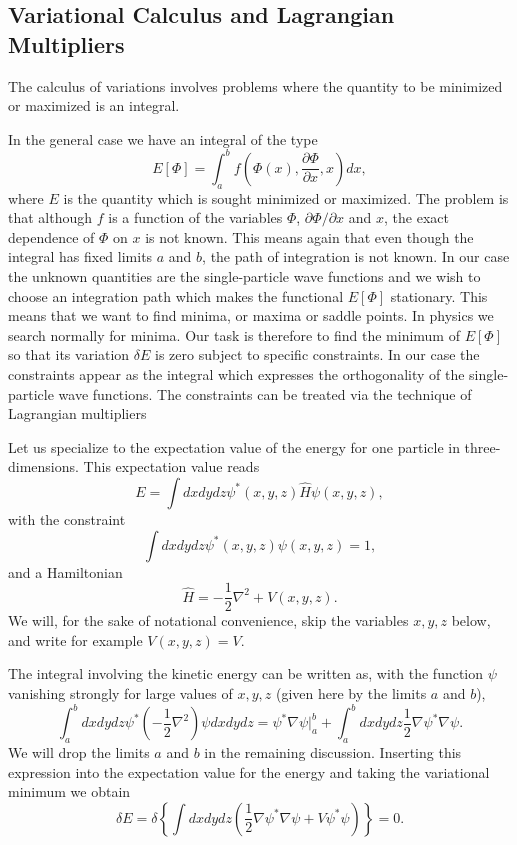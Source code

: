 \documentclass[%
twoside,                 %
final,                   %
10pt]{article}
\begin{document}
\subsection*{Variational Calculus and Lagrangian Multipliers}

The calculus of variations involves 
problems where the quantity to be minimized or maximized is an integral. 

In the general case we have an integral of the type
\[ 
E[\Phi]= \int_a^b f(\Phi(x),\frac{\partial \Phi}{\partial x},x)dx,
\]
where $E$ is the quantity which is sought minimized or maximized.
The problem is that although $f$ is a function of the variables $\Phi$, $\partial \Phi/\partial x$ and $x$, the exact dependence of
$\Phi$ on $x$ is not known.  This means again that even though the integral has fixed limits $a$ and $b$, the path of integration is
not known. In our case the unknown quantities are the single-particle wave functions and we wish to choose an integration path which makes
the functional $E[\Phi]$ stationary. This means that we want to find minima, or maxima or saddle points. In physics we search normally for minima.
Our task is therefore to find the minimum of $E[\Phi]$ so that its variation $\delta E$ is zero  subject to specific
constraints. In our case the constraints appear as the integral which expresses the orthogonality of the  single-particle wave functions.
The constraints can be treated via the technique of Lagrangian multipliers

Let us specialize to the expectation value of the energy for one particle in three-dimensions.
This expectation value reads
\[
  E=\int dxdydz \psi^*(x,y,z) \hat{H} \psi(x,y,z),
\]
with the constraint
\[
 \int dxdydz \psi^*(x,y,z) \psi(x,y,z)=1,
\]
and a Hamiltonian
\[
\hat{H}=-\frac{1}{2}\nabla^2+V(x,y,z).
\]
We will, for the sake of notational convenience,  skip the variables $x,y,z$ below, and write for example $V(x,y,z)=V$.

The integral involving the kinetic energy can be written as, with the function $\psi$ vanishing
strongly for large values of $x,y,z$ (given here by the limits $a$ and $b$), 
 \[
  \int_a^b dxdydz \psi^* \left(-\frac{1}{2}\nabla^2\right) \psi dxdydz = \psi^*\nabla\psi|_a^b+\int_a^b dxdydz\frac{1}{2}\nabla\psi^*\nabla\psi.
\]
We will drop the limits $a$ and $b$ in the remaining discussion. 
Inserting this expression into the expectation value for the energy and taking the variational minimum  we obtain
\[
\delta E = \delta \left\{\int dxdydz\left( \frac{1}{2}\nabla\psi^*\nabla\psi+V\psi^*\psi\right)\right\} = 0.
\]
\end{document}
